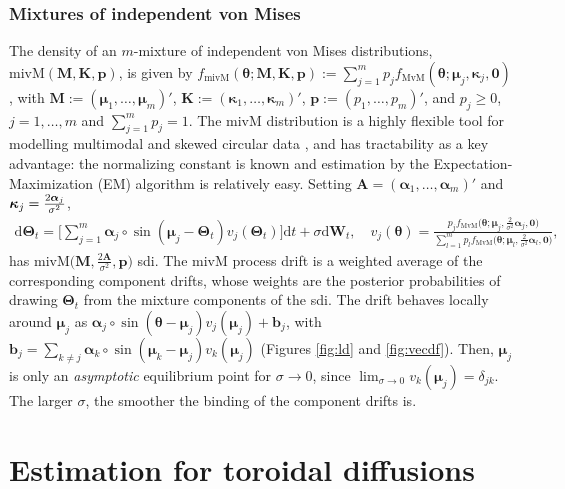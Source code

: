 \documentclass[oneside,11pt]{article}
\newcommand{\rd}{\mathrm{d}}
\newcommand{\bmu}{\boldsymbol\mu}
\newcommand{\bb}{\mathbf{b}}
\newcommand{\bp}{\mathbf{p}}
\newcommand{\ba}{\boldsymbol\alpha}
\newcommand{\btheta}{\boldsymbol\theta}
\newcommand{\bkappa}{\boldsymbol\kappa}
\newcommand{\bTheta}{\boldsymbol\Theta}
\newcommand{\bK}{\mathbf{K}}
\newcommand{\bA}{\mathbf{A}}
\newcommand{\bM}{\mathbf{M}}
\newcommand{\bW}{\mathbf{W}}
\begin{document}
\subsubsection{Mixtures of independent von Mises}

The density of an $m$-mixture of independent von Mises distributions, $\mathrm{mivM}(\bM,\bK,\bp)$, is given by $f_\mathrm{mivM}(\btheta;\bM,\allowbreak\bK,\bp)\allowbreak:=\sum_{j=1}^mp_jf_\mathrm{MvM}(\btheta;\bmu_j,\bkappa_j,\mathbf 0)$, with $\bM:=(\bmu_1,\allowbreak\ldots,\allowbreak\bmu_m)'$, $\bK:=(\bkappa_1,\ldots,\bkappa_m)'$, $\bp:=(p_1,\ldots,p_m)'$, and $p_j\geq0$, $j=1,\ldots,m$ and $\sum_{j=1}^mp_j=1$. The mivM distribution is a highly flexible tool for modelling multimodal and skewed circular data \citep{Banerjee2005}, and has tractability as a key advantage: the normalizing constant is known and estimation by the Expectation-Maximization (EM) algorithm is relatively easy. Setting $\bA=(\ba_1,\ldots,\ba_m)'$ and $\bkappa_j=\nolinebreak[4]\frac{2\ba_j}{\sigma^2}$,
\begin{align}
\rd \bTheta_t=\bigg[\sum_{j=1}^m\ba_j\circ \sin(\bmu_j-\bTheta_t)v_j(\bTheta_t)\bigg]\rd t +\sigma\rd \bW_t,\quad v_j(\btheta)=\frac{p_jf_{\mathrm{MvM}}\big(\btheta;\bmu_j,\frac{2}{\sigma^2}\ba_j,\mathbf 0\big)}{\sum_{l=1}^mp_lf_{\mathrm{MvM}}\big(\btheta;\bmu_l,\frac{2}{\sigma^2}\ba_l,\mathbf 0\big)},\label{eq:mixvm}
\end{align}
has $\mathrm{mivM}\big(\bM,\frac{2\bA}{\sigma^2},\bp)$ sdi. The mivM process drift is a weighted average of the corresponding component drifts, whose weights are the posterior probabilities of drawing $\bTheta_t$ from the mixture components of the sdi. The drift behaves locally around $\bmu_j$ as $\ba_j\circ\sin(\btheta-\bmu_j)v_j(\bmu_j)+\bb_j$, with $\bb_j=\sum_{k\neq j}\ba_k\circ \sin(\bmu_k-\bmu_j)v_k(\bmu_j)$ (Figures \ref{fig:ld} and \ref{fig:vecdf}). Then, $\bmu_j$ is only an \textit{asymptotic} equilibrium point for $\sigma\to0$, since $\lim_{\sigma\to0}v_k(\bmu_j)=\delta_{jk}$. The larger $\sigma$, the smoother the binding of the component drifts is.

\section{Estimation for toroidal diffusions}
\label{sec:est}
\end{document}
